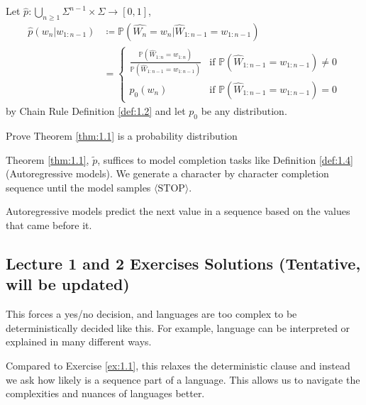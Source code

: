 \documentclass[12pt, twoside]{article}
\begin{document}
\begin{theorem} \label{thm:1.1}
Let $\hat{p}:\bigcup_{n \geq 1}\Sigma^{n-1} \times \hat{\Sigma}\to [0,1]$,
\begin{align*}
\hat{p}(w_n|w_{1:n-1})
  &\coloneqq \mathbb{P}(\hat{W_n}=w_n|\hat{W}_{1:n-1}=w_{1:n-1}) \\
  &= \begin{cases}
       \frac{\mathbb{P}(\hat{W}_{1:n}=w_{1:n})}{\mathbb{P}(\hat{W}_{1:n-1}=w_{1:n-1})} & \text{if } \mathbb{P}(\hat{W}_{1:n-1}=w_{1:n-1}) \neq 0 \\
       p_0(w_n)  & \text{if } \mathbb{P}(\hat{W}_{1:n-1}=w_{1:n-1}) = 0
     \end{cases}
\end{align*}
by Chain Rule Definition \ref{def:1.2} and let $p_0$ be any distribution.


\end{theorem}


\begin{exercise} \label{ex:1.4}
    Prove Theorem \ref{thm:1.1} is a probability distribution
\end{exercise}

\begin{remark}
Theorem \ref{thm:1.1}, $\tilde{p}$, suffices to model completion tasks like Definition \ref{def:1.4} (Autoregressive models). We generate a character by character completion sequence until the model samples $\langle \text{STOP} \rangle$.
\end{remark}

\begin{definition} \label{def:1.4}
Autoregressive models predict the next value in a sequence based on the values that came before it.
\end{definition}
\newpage

\subsection*{Lecture 1 and 2 Exercises Solutions \small (Tentative, will be updated)}

\begin{soln}
    This forces a yes/no decision, and languages are too complex to be deterministically decided like this. For example, language can be interpreted or explained in many different ways.
\end{soln}

\begin{soln}
    Compared to Exercise \ref{ex:1.1}, this relaxes the deterministic clause and instead we ask how likely is a sequence part of a language. This allows us to navigate the complexities and nuances of languages better.
\end{soln}
\end{document}
